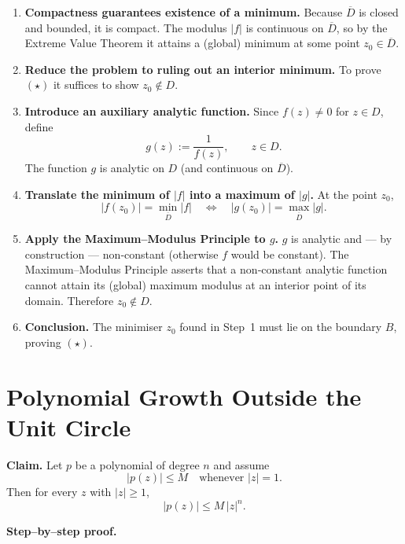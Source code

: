 \documentclass[12pt]{article}
\theoremstyle{definition} %
\theoremstyle{plain} %
\begin{document}
\begin{enumerate}
\item \textbf{Compactness guarantees existence of a minimum.}  
      Because $\overline{D}$ is closed and bounded, it is compact.  
      The modulus $|f|$ is continuous on $\overline{D}$, so by the Extreme
      Value Theorem it attains a (global) minimum at some point
      $z_{0}\in\overline{D}$.

\item \textbf{Reduce the problem to ruling out an interior minimum.}  
      To prove $(\star)$ it suffices to show $z_{0}\notin D$.

\item \textbf{Introduce an auxiliary analytic function.}  
      Since $f(z)\neq0$ for $z\in D$, define
      \[
          g(z):=\frac{1}{f(z)},\qquad z\in D .
      \]
      The function $g$ is analytic on $D$ (and continuous on $\overline{D}$).

\item \textbf{Translate the minimum of $|f|$ into a maximum of $|g|$.}  
      At the point $z_{0}$,
      \[
           |f(z_{0})| = \min_{\overline{D}}|f|
           \quad\Longleftrightarrow\quad
           |g(z_{0})| = \max_{\overline{D}}|g|.
      \]

\item \textbf{Apply the Maximum–Modulus Principle to $g$.}  
      $g$ is analytic and — by construction — non‑constant
      (otherwise $f$ would be constant).
      The Maximum–Modulus Principle asserts that a non‑constant analytic
      function cannot attain its (global) maximum modulus at an interior
      point of its domain.
      Therefore $z_{0}\notin D$.

\item \textbf{Conclusion.}  
      The minimiser $z_{0}$ found in Step 1 must lie on the boundary $B$,
      proving $(\star)$.
\end{enumerate}
\section*{Polynomial Growth Outside the Unit Circle}

\textbf{Claim.}\;
Let $p$ be a polynomial of degree $n$ and assume
\[
   |p(z)|\le M
   \quad\text{whenever }|z|=1 .
\]
Then for every $z$ with $|z|\ge 1$,
\[
   |p(z)|\le M\,|z|^{n}.
   \tag{$\ast$}
\]

\bigskip
\textbf{Step--by--step proof.}
\end{document}
